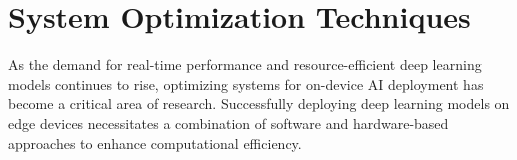 \section{System Optimization Techniques}

As the demand for real-time performance and resource-efficient deep learning models continues to rise, optimizing systems for on-device AI deployment has become a critical area of research. Successfully deploying deep learning models on edge devices necessitates a combination of software and hardware-based approaches to enhance computational efficiency.








